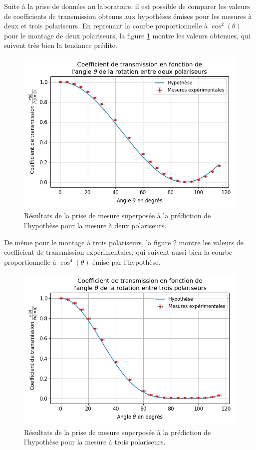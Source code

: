 \documentclass[11pt,letterpaper]{article}
\begin{document}
Suite à la prise de données au laboratoire, il est possible de comparer les valeurs de
coefficients de transmission obtenus aux hypothèses émises pour les mesures à deux et trois polariseurs.
En reprenant la courbe proportionnelle à $\cos^{2}\left( \theta \right)$ pour le montage de
deux polariseurs, la figure \ref{2pol} montre les valeurs obtenues, qui suivent très bien la
tendance prédite.

\begin{figure}[H]
  \centering
  \includegraphics[scale=0.7]{viz_deux_pol.png}
  \caption{Résultats de la prise de mesure superposée à la prédiction de l'hypothèse pour la 
  mesure à deux polariseurs.}
  \label{2pol}
\end{figure}

De même pour le montage à trois polariseurs, la figure \ref{3pol} montre les valeurs de coefficient
de transmission expérimentales, qui suivent aussi bien la courbe proportionnelle à 
$\cos^{4}\left( \theta \right)$ émise par l'hypothèse.

\begin{figure}[H]
  \centering
  \includegraphics[scale=0.7]{viz_trois_pol.png}
  \caption{Résultats de la prise de mesure superposée à la prédiction de l'hypothèse pour la 
  mesure à trois polariseurs.}
  \label{3pol}
\end{figure}
\end{document}
